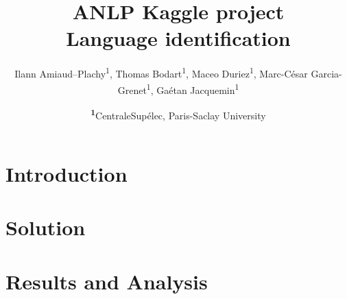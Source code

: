\documentclass[
	a4paper, %
	10pt, %
	unnumberedsections, %
	twoside, %
]{LTJournalArticle}
\title{ANLP Kaggle project\\ \LARGE Language identification} %
\author{%
    Ilann Amiaud--Plachy\textsuperscript{1},
    Thomas Bodart\textsuperscript{1},
    Maceo Duriez\textsuperscript{1},
    Marc-César Garcia-Grenet\textsuperscript{1},
    Gaétan Jacquemin\textsuperscript{1}
}
\date{\footnotesize\textsuperscript{\textbf{1}}CentraleSupélec, Paris-Saclay University}
\begin{document}
\maketitle %


\section{Introduction}

    

\section{Solution}

    

\section{Results and Analysis}

    


    \printbibliography
\end{document}
